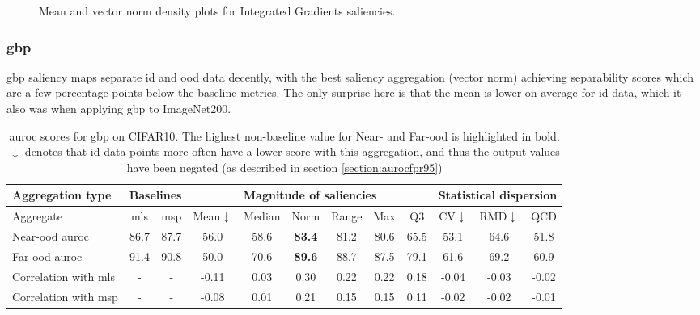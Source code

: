 \documentclass[UKenglish]{uiomasterthesis} %
\theoremstyle{definition}
\begin{document}
\begin{figure}[hbtp]
    \begin{center}
        
    \end{center}
    \caption[CIFAR10 mean and norm density plots for Integrated Gradients]{Mean and vector norm density plots for Integrated Gradients saliencies.}
    \label{fig:cifar10_integratedgradients_mean_norm}
\end{figure}

\subsubsection{\ac*{gbp}}

\ac{gbp} saliency maps separate \ac{id} and \ac{ood} data decently, with the best saliency aggregation (vector norm) achieving separability scores which are a few percentage points below the baseline metrics. The only surprise here is that the mean is lower on average for \ac{id} data, which it also was when applying \ac{gbp} to ImageNet200.

\begin{table}[hbtp]
\setlength\tabcolsep{3pt}
\begin{center}
\begin{tabular}{ |p{5.1em}|c c|c c c c c c|c c c| }
    \hline
     \centering Aggregation type & \multicolumn{2}{c|}{Baselines} & \multicolumn{6}{c|}{Magnitude of saliencies} & \multicolumn{3}{p{8em}|}{\centering Statistical dispersion} \\
    \hline
    Aggregate & \ac{mls} & \ac{msp} & Mean$\downarrow$ & Median & Norm & Range & Max & Q3 & CV$\downarrow$ & RMD$\downarrow$ & QCD  \\
    \hline
    \rowcolor{near!50}
    Near-\ac{ood} \ac{auroc} & 86.7 & 87.7 & 56.0 & 58.6 &\textbf{ 83.4 }& 81.2 & 80.6 & 65.5 & 53.1 & 64.6 & 51.8  \\
    \hline
    \rowcolor{far!50}
    Far-\ac{ood} \ac{auroc} & 91.4 & 90.8 & 50.0 & 70.6 &\textbf{ 89.6 }& 88.7 & 87.5 & 79.1 & 61.6 & 69.2 & 60.9  \\
    \hline
    Correlation with \ac{mls}& - & - & -0.11 & 0.03 & 0.30 & 0.22 & 0.22 & 0.18 & -0.04 & -0.03 & -0.02  \\
    \hline
    Correlation with \ac{msp}& - & - & -0.08 & 0.01 & 0.21 & 0.15 & 0.15 & 0.11 & -0.02 & -0.02 & -0.01  \\
    \hline
    \end{tabular}
    \caption[\ac{auroc} scores for \ac{gbp} on CIFAR10]{\ac{auroc} scores for \ac{gbp} on CIFAR10. The highest non-baseline value for Near- and Far-\ac{ood} is highlighted in bold. $\downarrow$ denotes that \ac{id} data points more often have a lower score with this aggregation, and thus the output values have been negated (as described in section \ref{section:aurocfpr95})}
    \label{table:cifar10_gbp_metrics}
\end{center}
\setlength\tabcolsep{6pt}
\end{table}
\end{document}
